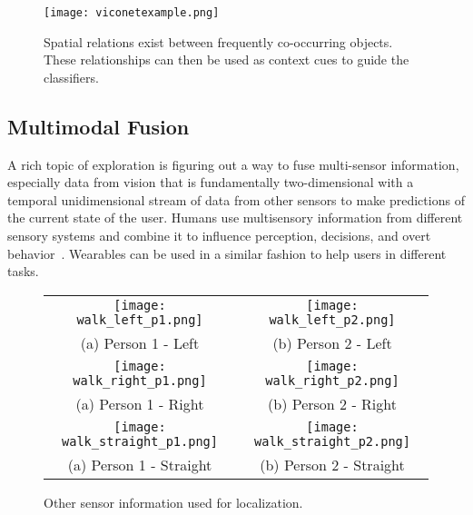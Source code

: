 \begin{figure}[!htb]
\centering
\texttt{[image: viconetexample.png]}
\caption{Spatial relations exist between frequently co-occurring objects. These relationships can then be used as context cues to guide the classifiers.}
\label{fig:viconet}
\end{figure} 

\subsection{Multimodal Fusion}
A rich topic of exploration is figuring out a way to fuse multi-sensor information, especially data from vision that is fundamentally two-dimensional with a temporal 
unidimensional stream of data from other sensors to make predictions of the current state of the user. 
Humans use multisensory information from different sensory systems and combine it to influence 
perception, decisions, and overt behavior~\cite{stein2009neural}. Wearables can be used in a similar fashion to help users in different tasks. 

\begin{figure}[!htb]
\centering
\begin{tabular}{@{}c@{} @{}c@{}}
\vspace{-5pt}
\texttt{[image: walk\_left\_p1.png]} & \texttt{[image: walk\_left\_p2.png]}\\[\abovecaptionskip]
\small(a) Person 1 - Left & \small (b) Person 2 - Left\\
\texttt{[image: walk\_right\_p1.png]} & \texttt{[image: walk\_right\_p2.png]}\\[\abovecaptionskip]
\small(a) Person 1 - Right & \small (b) Person 2 - Right\\
\texttt{[image: walk\_straight\_p1.png]} & \texttt{[image: walk\_straight\_p2.png]}\\[\abovecaptionskip]
\small(a) Person 1 - Straight & \small (b) Person 2 - Straight\\
\end{tabular}
\caption{Other sensor information used for localization.}
\label{tab:sensor}
\end{figure}

